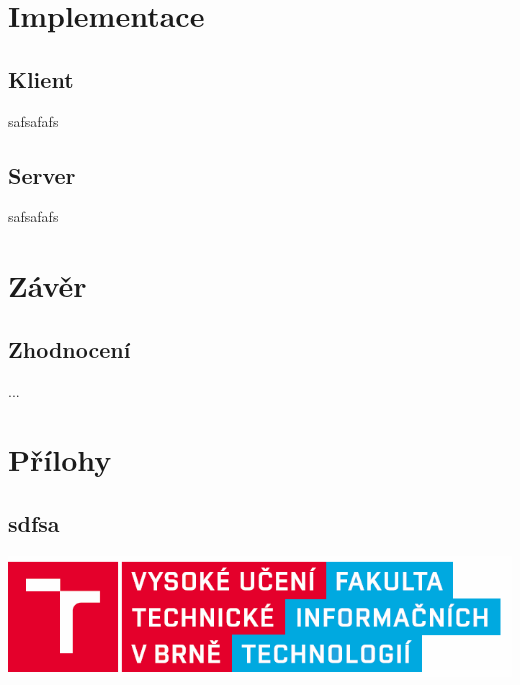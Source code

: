 \documentclass[11pt]{article}
\begin{document}
	
	
	\section{Implementace}	
		\subsection{Klient}
			\begin{flushleft}
				safsafafs \par			
			\end{flushleft}
	
		\subsection{Server}
			\begin{flushleft}
				safsafafs \par			
			\end{flushleft}	
	\section{Závěr}
		
			\begin{adjustwidth}{1cm}{0cm}
				\subsection{Zhodnocení}
				\begin{flushleft}
				...\par
				\end{flushleft}
			\end{adjustwidth}						
	\vfill
	
	\newpage
	\section{Přílohy}
		\subsection{sdfsa}
	\begin{center}
		\includegraphics[scale = 0.45]{logo.png}\\
	\end{center}
	\vfill
	
\end{document}
